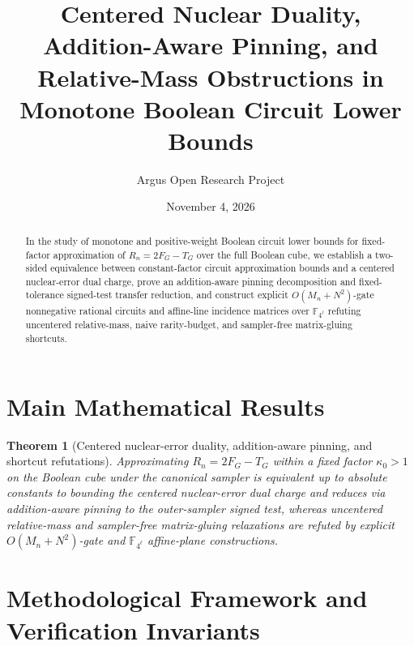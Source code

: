 \documentclass[10pt,reqno]{amsart}
\title[Centered Nuclear Duality and Pinning in Monotone Circuit Complexity]
{Centered Nuclear Duality, Addition-Aware Pinning, and Relative-Mass Obstructions in Monotone Boolean Circuit Lower Bounds}
\author{Argus Open Research Project}
\date{November 4, 2026}
\newtheorem{theorem}{Theorem}[section]
\theoremstyle{definition}
\begin{document}
\begin{abstract}
In the study of monotone and positive-weight Boolean circuit lower bounds for fixed-factor approximation of $R_n = 2F_G - T_G$ over the full Boolean cube, we establish a two-sided equivalence between constant-factor circuit approximation bounds and a centered nuclear-error dual charge, prove an addition-aware pinning decomposition and fixed-tolerance signed-test transfer reduction, and construct explicit $O(M_n+N^2)$-gate nonnegative rational circuits and affine-line incidence matrices over $\mathbb{F}_{4^\ell}$ refuting uncentered relative-mass, naive rarity-budget, and sampler-free matrix-gluing shortcuts.
\end{abstract}
\maketitle

\section{Main Mathematical Results}
\begin{theorem}[Centered nuclear-error duality, addition-aware pinning, and shortcut refutations]
Approximating $R_n = 2F_G - T_G$ within a fixed factor $\kappa_0 > 1$ on the Boolean cube under the canonical sampler is equivalent up to absolute constants to bounding the centered nuclear-error dual charge and reduces via addition-aware pinning to the outer-sampler signed test, whereas uncentered relative-mass and sampler-free matrix-gluing relaxations are refuted by explicit $O(M_n+N^2)$-gate and $\mathbb{F}_{4^\ell}$ affine-plane constructions.
\end{theorem}

\section{Methodological Framework and Verification Invariants}
\end{document}

